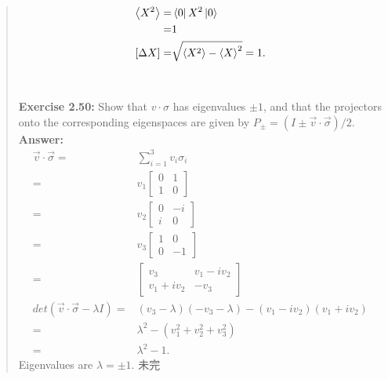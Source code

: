\documentclass[UTF8]{ctexart}
\begin{document}
\begin{quote}
\begin{equation}
\begin{aligned}
		\left \langle X^{2}\right\rangle=&\bra{0}X^{2}\ket{0} \\
									=&1\\
		[\Delta X]=&\sqrt{\left \langle X^{2}\right\rangle-\left \langle X\right\rangle^{2}}=1.				
	\end{aligned}
	\end{equation}
\\
\\
\textbf{Exercise 2.50: } Show that $v\cdot \sigma$ has eigenvalues $\pm1$, 
and that the projectors onto the corresponding eigenspaces are given
 by $P_{\pm} = (I \pm \vec{v}\cdot \vec{\sigma})/2$.
 \\
\textbf{Answer:}	 \\
\begin{equation}
	\begin{aligned}
\vec{v}\cdot\vec{\sigma}=&\sum_{i=1}^{3}v_{i}\sigma_{i}\\
						=&v_{1}\begin{bmatrix}
							0 &1 \\1 & 0
						\end{bmatrix} \\
						=&v_{2}\begin{bmatrix}
							0 &-i \\i & 0
						\end{bmatrix}\\
						=&v_{3}\begin{bmatrix}
							1 &0 \\0 & -1
						\end{bmatrix} \\
						=&\begin{bmatrix}
							v_{3} & v_{1}-iv_{2} \\
							v_{1}+iv_{2} & -v_{3}
						\end{bmatrix} \\
	det(\vec{v}\cdot\vec{\sigma}-\lambda I)=&(v_{3}-\lambda)(-v_{3}-\lambda)
										  -(v_{1}-iv_{2})(v_{1}+iv_{2}) \\
										  =&\lambda^{2}-(v_{1}^{2}+v_{2}^{2}+v_{3}^{2}) \\
										  =&\lambda^{2}-1.
	\end{aligned}
	\end{equation}
	Eigenvalues are $λ = \pm1.$
未完

\end{quote}
\end{document}
